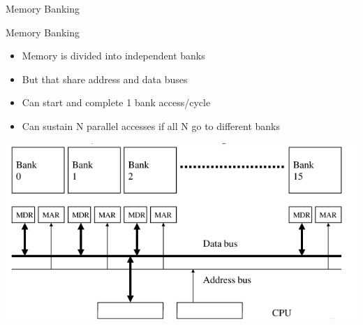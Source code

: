 \documentclass[presentation]{beamer}
\begin{document}
\begin{frame}[label={sec:orgce8c22f}]{Memory Banking}
\begin{block}{Memory Banking}
\begin{itemize}
\item Memory is divided into \alert{independent banks}
\item But that \alert{share} address and data \alert{buses}
\item Can start and complete \alert{1 bank access/cycle}
\item Can sustain \alert{N parallel accesses} if all N go to different banks
\end{itemize}
\end{block}

\begin{block}{}
\begin{center}
\includegraphics[width=.9\linewidth]{./images/slides_SIMD_32_small.png}
\end{center}
\end{block}
\end{frame}
\end{document}
